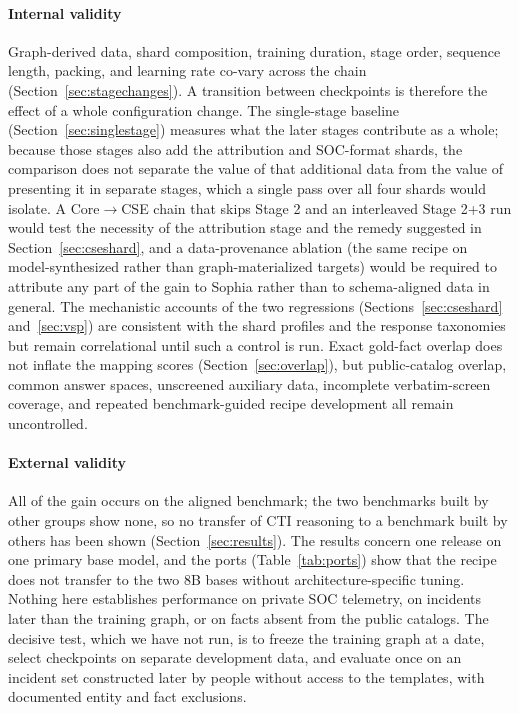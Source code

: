 \documentclass[twocolumn]{svjour3}
\begin{document}
\paragraph{Internal validity}
Graph-derived data, shard composition, training duration, stage order, sequence length, packing, and learning rate co-vary across the chain (Section~\ref{sec:stagechanges}). A transition between checkpoints is therefore the effect of a whole configuration change. The single-stage baseline (Section~\ref{sec:singlestage}) measures what the later stages contribute as a whole; because those stages also add the attribution and SOC-format shards, the comparison does not separate the value of that additional data from the value of presenting it in separate stages, which a single pass over all four shards would isolate. A Core$\rightarrow$CSE chain that skips Stage 2 and an interleaved Stage 2+3 run would test the necessity of the attribution stage and the remedy suggested in Section~\ref{sec:cseshard}, and a data-provenance ablation (the same recipe on model-synthesized rather than graph-materialized targets) would be required to attribute any part of the gain to Sophia rather than to schema-aligned data in general. The mechanistic accounts of the two regressions (Sections~\ref{sec:cseshard} and~\ref{sec:vsp}) are consistent with the shard profiles and the response taxonomies but remain correlational until such a control is run. Exact gold-fact overlap does not inflate the mapping scores (Section~\ref{sec:overlap}), but public-catalog overlap, common answer spaces, unscreened auxiliary data, incomplete verbatim-screen coverage, and repeated benchmark-guided recipe development all remain uncontrolled.

\paragraph{External validity}
All of the gain occurs on the aligned benchmark; the two benchmarks built by other groups show none, so no transfer of CTI reasoning to a benchmark built by others has been shown (Section~\ref{sec:results}). The results concern one release on one primary base model, and the ports (Table~\ref{tab:ports}) show that the recipe does not transfer to the two 8B bases without architecture-specific tuning. Nothing here establishes performance on private SOC telemetry, on incidents later than the training graph, or on facts absent from the public catalogs. The decisive test, which we have not run, is to freeze the training graph at a date, select checkpoints on separate development data, and evaluate once on an incident set constructed later by people without access to the templates, with documented entity and fact exclusions.
\end{document}

